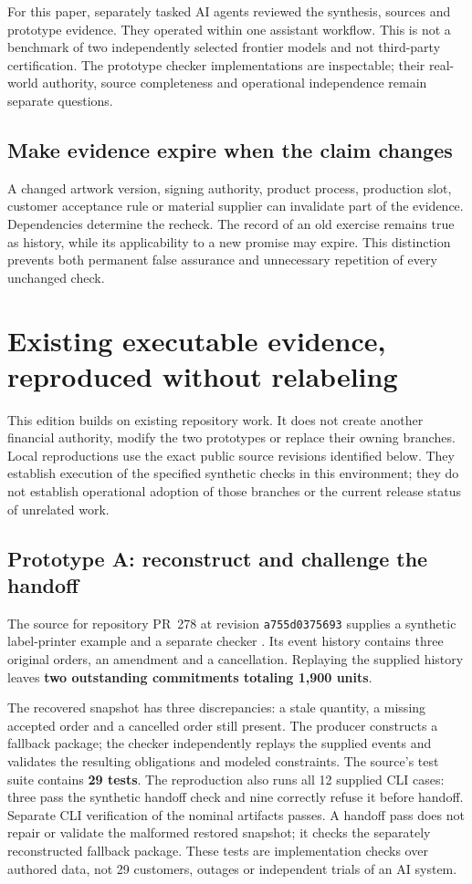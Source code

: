 \documentclass[11pt,a4paper]{article}
\begin{document}
For this paper, separately tasked AI agents reviewed the synthesis, sources and prototype evidence. They operated within one assistant workflow. This is not a benchmark of two independently selected frontier models and not third-party certification. The prototype checker implementations are inspectable; their real-world authority, source completeness and operational independence remain separate questions.

\subsection{Make evidence expire when the claim changes}
A changed artwork version, signing authority, product process, production slot, customer acceptance rule or material supplier can invalidate part of the evidence. Dependencies determine the recheck. The record of an old exercise remains true as history, while its applicability to a new promise may expire. This distinction prevents both permanent false assurance and unnecessary repetition of every unchanged check.

\section{Existing executable evidence, reproduced without relabeling}\label{sec:evidence}
This edition builds on existing repository work. It does not create another financial authority, modify the two prototypes or replace their owning branches. Local reproductions use the exact public source revisions identified below. They establish execution of the specified synthetic checks in this environment; they do not establish operational adoption of those branches or the current release status of unrelated work.

\subsection{Prototype A: reconstruct and challenge the handoff}
The source for repository PR~278 at revision \texttt{a755d0375693} supplies a synthetic label-printer example and a separate checker \cite{handoffSource}. Its event history contains three original orders, an amendment and a cancellation. Replaying the supplied history leaves \textbf{two outstanding commitments totaling 1,900 units}.

The recovered snapshot has three discrepancies: a stale quantity, a missing accepted order and a cancelled order still present. The producer constructs a fallback package; the checker independently replays the supplied events and validates the resulting obligations and modeled constraints. The source's test suite contains \textbf{29 tests}. The reproduction also runs all 12 supplied CLI cases: three pass the synthetic handoff check and nine correctly refuse it before handoff. Separate CLI verification of the nominal artifacts passes. A handoff pass does not repair or validate the malformed restored snapshot; it checks the separately reconstructed fallback package. These tests are implementation checks over authored data, not 29 customers, outages or independent trials of an AI system.
\end{document}

